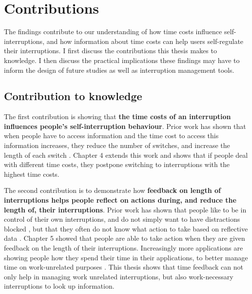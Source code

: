 \section{Contributions}
The findings contribute to our understanding of how time costs influence self-interruptions, and how information about time costs can help users self-regulate their interruptions. I first discuss the contributions this thesis makes to knowledge. I then discuss the practical implications these findings may have to inform the design of future studies as well as interruption management tools. 






\subsection{Contribution to knowledge}
The first contribution is showing that \textbf{the time costs of an interruption influences people’s self-interruption behaviour}. Prior work has shown that when people have to access information and the time cost to access this information increases, they reduce the number of switches, and increase the length of each switch \citep{Gray2006}. Chapter 4 extends this work and shows that if people deal with different time costs, they postpone switching to interruptions with the highest time costs. 

The second contribution is to demonstrate how \textbf{feedback on length of interruptions helps people reflect on actions during, and reduce the length of, their interruptions}. Prior work has shown that people like to be in control of their own interruptions, and do not simply want to have distractions blocked \citep{Mark2018}, but that they often do not know what action to take based on reflective data \citep{Collins2014, Whittaker2016}. Chapter 5 showed that people are able to take action when they are given feedback on the length of their interruptions. Increasingly more applications are showing people how they spend their time in their applications, to better manage time on work-unrelated purposes \citep{Constine2018, Constine2018a, Lynley2018}. This thesis shows that time feedback can not only help in managing work unrelated interruptions, but also work-necessary interruptions to look up information.


